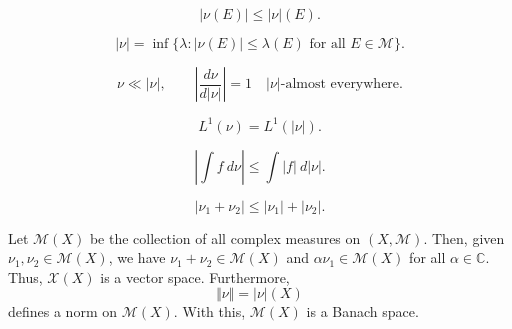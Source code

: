 \documentclass[11pt]{article}
\newcommand{\C}{\mathbb{C}}
\newcommand{\M}{\mathcal{M}}
\theoremstyle{definition}
\theoremstyle{remark}
\begin{document}
    \begin{lemma}
        \[
            |\nu(E)| \leq |\nu|(E).
        \]
    \end{lemma}

    \begin{lemma}
        \[
            |\nu| = \inf\{\lambda : |\nu(E)| \leq \lambda(E) \text{ for all } E \in
            \M\}.
        \]
    \end{lemma}

    \begin{lemma}
        \[
            \nu \ll |\nu|, \qquad
            \left|\frac{d\nu}{d|\nu|}\right| = 1\quad|\nu|\text{-almost everywhere}.
        \]
    \end{lemma}

    \begin{lemma}
        \[
            L^1(\nu) = L^1(|\nu|).
        \]
    \end{lemma}

    \begin{lemma}
        \[
            |\int f\:d\nu| \leq \int |f|\:d|\nu|.
        \]
    \end{lemma}

    \begin{lemma}
        \[
            |\nu_1 + \nu_2| \leq |\nu_1| + |\nu_2|.
        \]
    \end{lemma}


    \begin{theorem}
        Let $\mathscr{M}(X)$ be the collection of all complex measures on $(X, \M)$.
        Then, given $\nu_1, \nu_2 \in \mathscr{M}(X)$, we have $\nu_1 + \nu_2 \in
        \mathscr{M}(X)$ and $\alpha\nu_1 \in \mathscr{M}(X)$ for all $\alpha \in \C$.
        Thus, $\mathscr{X}(X)$ is a vector space. Furthermore, \[
            \Vert \nu\Vert = |\nu|(X)
        \] defines a norm on $\mathscr{M}(X)$. With this, $\mathscr{M}(X)$ is a
        Banach space.
    \end{theorem}
\end{document}
